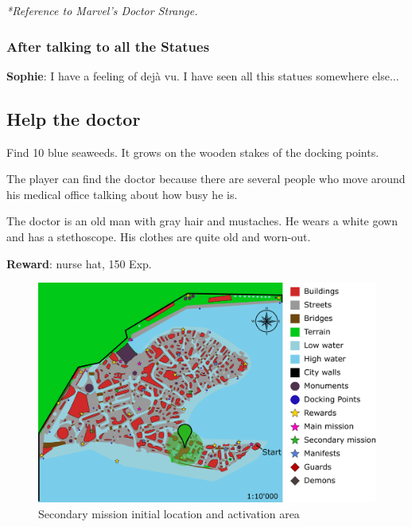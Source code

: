 \textit{*Reference to Marvel\texttrademark 's Doctor Strange.}

\subsubsection*{After talking to all the Statues}
\textbf{Sophie}: I have a feeling of dejà vu. I have seen all this statues somewhere else...


\subsection{Help the doctor}
Find 10 blue seaweeds. It grows on the wooden stakes of the docking points.

The player can find the doctor because there are several people who move around his medical office talking about how busy he is.

The doctor is an old man with gray hair and mustaches. He wears a white gown and has a stethoscope. His clothes are quite old and worn-out.

\textbf{Reward}: nurse hat, 150 Exp.

\begin{figure}[H]
  \centering
  \includegraphics[width=\textwidth]{../Images/Maps/dynamiaSecondaryMissions_Doctor}
  \caption{Secondary mission initial location and activation area}
\end{figure}

